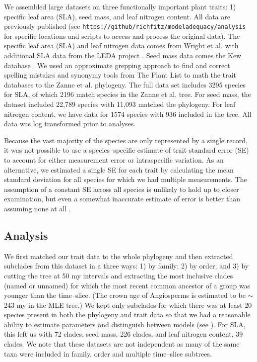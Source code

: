 \documentclass[a4paper,12pt]{article}
\begin{document}
We assembled large datasets on three functionally important plant traits: 1) specific leaf area (SLA), seed mass, and leaf nitrogen content. All data are previously published (see \texttt{https://github/richfitz/modeladequacy/analysis} for specific locations and scripts to access and process the original data). The specific leaf area (SLA) and leaf nitrogen data comes from Wright et al. \citep{Wright2004} with additional SLA data from the LEDA project \citep{Kleyer2008}. Seed mass data comes the Kew database \citep{Kew2008}. We used an approximate grepping approach to find and correct spelling mistakes and synonymy tools from The Plant List \citep{plantlist} to math the trait databases to the Zanne et al. phylogeny. 
The full data set includes 3295 species for SLA, of which 2196 match species in the Zanne et al. tree. For seed mass, the dataset included 22,789 species with 11,093 matched the phylogeny. For leaf nitrogen content, we have data for 1574 species with 936 included in the tree. All data was log transformed prior to analyses.

Because the vast majority of the species are only represented by a single
record, it was not possible to use a species--specific estimate of
trait standard error (SE) to account for either measurement error or
intraspecific variation.  As an alternative, we estimated a single SE for each trait
by calculating the mean
standard deviation for all species for which we had multiple
measurements. The assumption of a constant SE across all species is
unlikely to hold up to closer examination, but even a somewhat
inaccurate estimate of error is better than assuming none at all
\citep{Hansen2012}.

\subsection{Analysis}

We first matched our trait data to the whole phylogeny and then extracted subclades from this dataset in a three ways: 1) by family; 2) by order; and 3) by cutting the tree at 50 my intervals and extracting the most inclusive clades (named or unnamed) for which the most recent common ancestor of a group was younger than the time--slice. 
(The crown age of Angiosperms is estimated to be $\sim$243 my in the MLE tree.) We kept only subclades for which there was at least 20 species present in both the phylogeny and trait data so that we had a reasonable ability to estimate parameters and distinguish between models (see \citep{Boettiger2012, SlaterPennell}). 
For SLA, this left us with 72 clades, seed mass, 226 clades, and leaf nitrogen content, 39 clades. We note that these datasets are not independent as many of the same taxa were included in family, order and multiple time--slice subtrees. 
\end{document}
